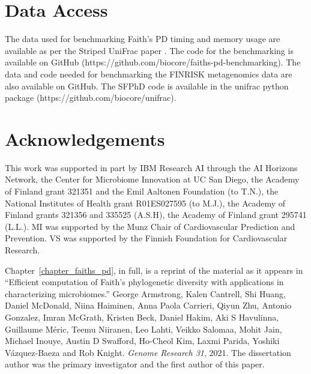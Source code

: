 \section{Data Access}
The data used for benchmarking Faith's PD timing and memory usage are available as per the Striped UniFrac paper \cite{McDonald2018-qq}. The code for the benchmarking is available on GitHub (https://github.com/biocore/faiths-pd-benchmarking). The data and code needed for benchmarking the FINRISK metagenomics data are also available on GitHub. The SFPhD code is available in the unifrac python package (https://github.com/biocore/unifrac). 

\section{Acknowledgements}
This work was supported in part by IBM Research AI through the AI Horizons Network, the Center for Microbiome Innovation at UC San Diego, the Academy of Finland grant 321351 and the Emil Aaltonen Foundation (to T.N.), the National Institutes of Health grant R01ES027595 (to M.J.), the Academy of Finland grants 321356 and 335525 (A.S.H), the Academy of Finland grant 295741 (L.L.). MI was supported by the Munz Chair of Cardiovascular Prediction and Prevention. VS was supported by the Finnish Foundation for Cardiovascular Research. 

Chapter~\ref{chapter_faiths_pd}, in full, is a reprint of the material as it appears in ``Efficient computation of Faith's phylogenetic diversity with applications in characterizing microbiomes.'' George Armstrong, Kalen Cantrell, Shi Huang, Daniel McDonald, Niina Haiminen, Anna Paola Carrieri, Qiyun Zhu, Antonio Gonzalez, Imran McGrath, Kristen Beck, Daniel Hakim, Aki S Havulinna, Guillaume Méric, Teemu Niiranen, Leo Lahti, Veikko Salomaa, Mohit Jain, Michael Inouye, Austin D Swafford, Ho-Cheol Kim, Laxmi Parida, Yoshiki Vázquez-Baeza and Rob Knight. \textit{Genome Research 31}, 2021. The dissertation author was the primary investigator and the first author of this paper.
